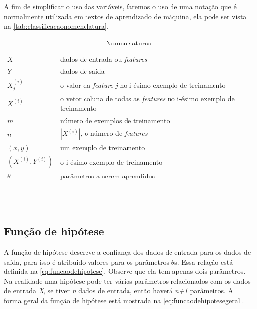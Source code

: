 A fim de simplificar o uso das variáveis, faremos o uso de uma notação que é normalmente utilizada em textos de aprendizado de máquina, ela pode ser vista na \autoref{tab:classificacaonomenclatura}.

\begin{table}[!htb]
\caption{Nomenclaturas} \label{tab:classificacaonomenclatura}
\begin{center}
\begin{tabular}{m{2cm}m{14.0cm}}
  \toprule
  $X$ & dados de entrada ou \textit{features} \\
  $Y$ & dados de saída \\
  $X_j^{(i)}$ & o valor da \textit{feature} \textit{j} no i-ésimo exemplo de treinamento \\
  $X^{(i)}$ & o vetor coluna de todas as \textit{features} no i-ésimo exemplo de treinamento \\
  $m$ & número de exemplos de treinamento \\
  $n$ & $|X^{(i)}|$, o número de \textit{features} \\
  $(x, y)$ & um exemplo de treinamento \\
  $(X^{(i)}, Y^{(i)})$ & o i-ésimo exemplo de treinamento \\
  $\theta$ & parâmetros a serem aprendidos \\
  \bottomrule
\end{tabular}
\end{center}

\end{table}



\ \\
\ \\

\subsection{Função de hipótese}

A função de hipótese descreve a confiança dos dados de entrada para os dados de saída, para isso é atribuido valores para os parâmetros $\theta$s. Essa relação está definida na \autoref{eq:funcaodehipotese}. Observe que ela tem apenas dois parâmetros. Na realidade uma hipótese pode ter vários parâmetros relacionados com os dados de entrada \textit{X}, se tiver \textit{n} dados de entrada, então haverá \textit{n+1} parâmetros. A forma geral da função de hipótese está mostrada na \autoref{eq:funcaodehipotesegeral}.

